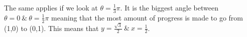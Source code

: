 \documentclass[preview]{standalone}
\begin{document}
\begin{center}
The same applies if we look at $\theta = \frac{1}{3} \pi$. It is the biggest angle between $\theta = 0 \ \& \ \theta = \frac{1}{2} \pi$ meaning that the most amount of progress is made to go from (1,0) to (0,1). This means that $y = \frac{\sqrt{3}}{2} \ \& \ x = \frac{1}{2}$.
\end{center}
\end{document}
